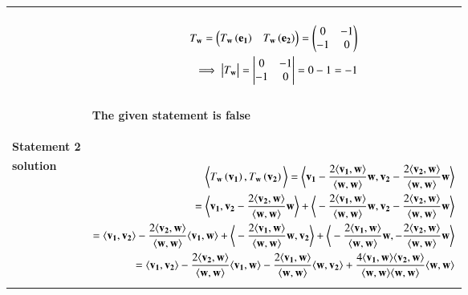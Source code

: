 \documentclass[journal,12pt]{IEEEtran}
\begin{document}
\begin{longtable}{|l|l|}
{\begin{align}
\end{align}}\\
& \parbox{10cm} {\begin{align}
T_\mathbf{w}=\begin{pmatrix}T_\mathbf{w}\left(\mathbf{e_1}\right) &T_\mathbf{w}\left(\mathbf{e_2}\right)\end{pmatrix}=\begin{pmatrix}0 & -1\\-1&0\end{pmatrix}\\
\implies \begin{vmatrix}{T_\mathbf{w}}\end{vmatrix}=\begin{vmatrix}0 & -1\\-1&0\end{vmatrix}=0-1=-1
\end{align}}\\
& \parbox{10cm}{\begin{center}
\textbf{The given statement is false}
\end{center}}\\
\hline 
\textbf{Statement 2} & \\
\hline
\textbf{solution}   & \parbox{13cm} {\begin{align}
\bigg\langle T_\vec{w}\brak{\vec{v_1}},T_\vec{w}\brak{\vec{v_2}}\bigg\rangle=\bigg\langle \vec{v_1}-\frac{2\langle \vec{v_1},\vec{w} \rangle}{\langle \vec{w},\vec{w} \rangle}\vec{w}, \vec{v_2}-\frac{2\langle \vec{v_2},\vec{w} \rangle}{\langle \vec{w},\vec{w} \rangle}\vec{w}\bigg\rangle\\
=\bigg\langle \vec{v_1},\vec{v_2}-\frac{2\langle \vec{v_2},\vec{w} \rangle}{\langle \vec{w},\vec{w} \rangle}\vec{w}\bigg\rangle+\bigg\langle-\frac{2\langle \vec{v_1},\vec{w} \rangle}{\langle \vec{w},\vec{w} \rangle}\vec{w},\vec{v_2}-\frac{2\langle \vec{v_2},\vec{w} \rangle}{\langle \vec{w},\vec{w} \rangle}\vec{w}\bigg\rangle\\
=\langle \vec{v_1},\vec{v_2}\rangle-\frac{2\langle \vec{v_2},\vec{w} \rangle}{\langle \vec{w}, \vec{w}\rangle}\langle\vec{v_1},\vec{w}\rangle+\bigg\langle-\frac{2\langle \vec{v_1},\vec{w} \rangle}{\langle \vec{w},\vec{w} \rangle}\vec{w},\vec{v_2}\bigg\rangle+\bigg\langle-\frac{2\langle \vec{v_1},\vec{w} \rangle}{\langle \vec{w},\vec{w} \rangle}\vec{w},-\frac{2\langle \vec{v_2},\vec{w} \rangle}{\langle \vec{w},\vec{w} \rangle}\vec{w}\bigg\rangle\\
=\langle \vec{v_1},\vec{v_2}\rangle-\frac{2\langle \vec{v_2},\vec{w} \rangle}{\langle \vec{w}, \vec{w}\rangle}\langle\vec{v_1},\vec{w}\rangle-\frac{2\langle \vec{v_1},\vec{w} \rangle}{\langle \vec{w},\vec{w} \rangle}\langle\vec{w},\vec{v_2}\rangle+\frac{4\langle\vec{v_1},\vec{w}\rangle \langle\vec{v_2},\vec{w}\rangle}{\langle \vec{w},\vec{w}\rangle\langle \vec{w},\vec{w}\rangle} {\langle\vec{w},\vec{w}\rangle}\\

\end{align}}
\end{longtable}
\end{document}
